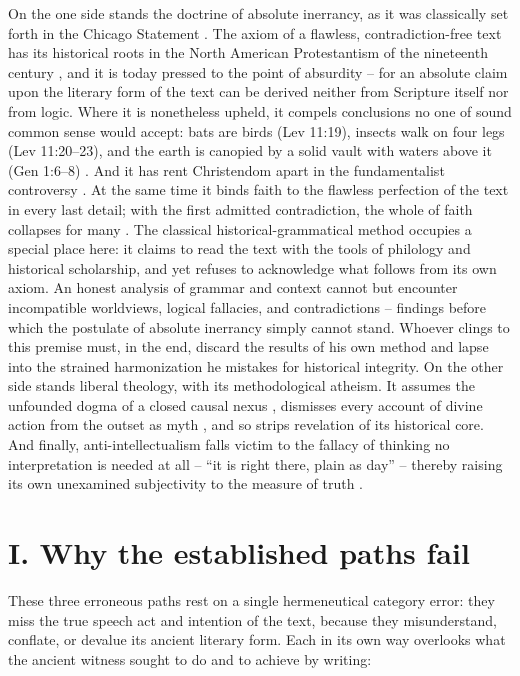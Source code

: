 \documentclass[11pt,a4paper]{article}
\begin{document}
On the one side stands the doctrine of absolute inerrancy, as it was classically set forth in the Chicago Statement \citep{icbi1978}. The axiom of a flawless, contradiction-free text has its historical roots in the North American Protestantism of the nineteenth century \citep{rogersmckim1979}, and it is today pressed to the point of absurdity -- for an absolute claim upon the literary form of the text can be derived neither from Scripture itself nor from logic. Where it is nonetheless upheld, it compels conclusions no one of sound common sense would accept: bats are birds (Lev 11:19), insects walk on four legs (Lev 11:20--23), and the earth is canopied by a solid vault with waters above it (Gen 1:6--8) \citep{wells2013}. And it has rent Christendom apart in the fundamentalist controversy \citep{marsden2006}. At the same time it binds faith to the flawless perfection of the text in every last detail; with the first admitted contradiction, the whole of faith collapses for many \citep{ehrman2009}. The classical historical-grammatical method occupies a special place here: it claims to read the text with the tools of philology and historical scholarship, and yet refuses to acknowledge what follows from its own axiom. An honest analysis of grammar and context cannot but encounter incompatible worldviews, logical fallacies, and contradictions -- findings before which the postulate of absolute inerrancy simply cannot stand. Whoever clings to this premise must, in the end, discard the results of his own method and lapse into the strained harmonization he mistakes for historical integrity. On the other side stands liberal theology, with its methodological atheism. It assumes the unfounded dogma of a closed causal nexus \citep{troeltsch1913,schlatter1905}, dismisses every account of divine action from the outset as myth \citep{bultmann1941}, and so strips revelation of its historical core. And finally, anti-intellectualism falls victim to the fallacy of thinking no interpretation is needed at all -- ``it is right there, plain as day'' -- thereby raising its own unexamined subjectivity to the measure of truth \citep{noll1994}.

\section*{I. Why the established paths fail}

These three erroneous paths rest on a single hermeneutical category error: they miss the true speech act and intention of the text, because they misunderstand, conflate, or devalue its ancient literary form. Each in its own way overlooks what the ancient witness sought to do and to achieve by writing:
\end{document}
